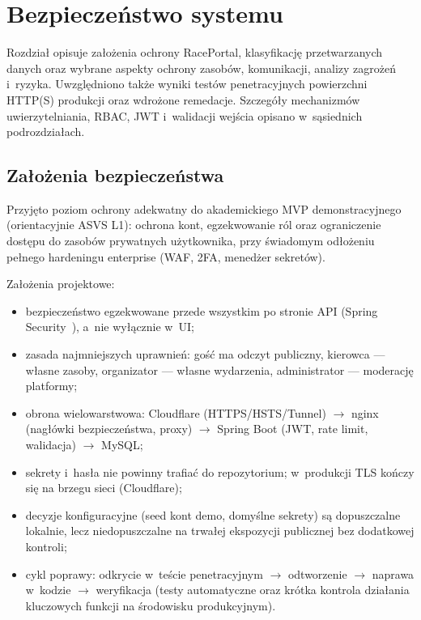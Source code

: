 \documentclass{sprz}
\begin{document}
\chapter{Bezpieczeństwo systemu}
\label{ch:bezpieczenstwo}
Rozdział opisuje założenia ochrony RacePortal, klasyfikację przetwarzanych danych oraz wybrane aspekty ochrony zasobów, komunikacji, analizy zagrożeń i~ryzyka. Uwzględniono także wyniki testów penetracyjnych powierzchni HTTP(S) produkcji oraz wdrożone remedacje. Szczegóły mechanizmów uwierzytelniania, RBAC, JWT i~walidacji wejścia opisano w~sąsiednich podrozdziałach.

\section{Założenia bezpieczeństwa}
Przyjęto poziom ochrony adekwatny do akademickiego MVP demonstracyjnego (orientacyjnie ASVS L1): ochrona kont, egzekwowanie ról oraz ograniczenie dostępu do zasobów prywatnych użytkownika, przy świadomym odłożeniu pełnego hardeningu enterprise (WAF, 2FA, menedżer sekretów).

Założenia projektowe:
\begin{itemize}
  \item bezpieczeństwo egzekwowane przede wszystkim po stronie API (Spring Security~\cite{spring:security}), a~nie wyłącznie w~UI;
  \item zasada najmniejszych uprawnień: gość ma odczyt publiczny, kierowca --- własne zasoby, organizator --- własne wydarzenia, administrator --- moderację platformy;
  \item obrona wielowarstwowa: Cloudflare (HTTPS/HSTS/Tunnel) $\rightarrow$ nginx (nagłówki bezpieczeństwa, proxy) $\rightarrow$ Spring Boot (JWT, rate limit, walidacja) $\rightarrow$ MySQL;
  \item sekrety i~hasła nie powinny trafiać do repozytorium; w~produkcji TLS kończy się na brzegu sieci (Cloudflare);
  \item decyzje konfiguracyjne (seed kont demo, domyślne sekrety) są dopuszczalne lokalnie, lecz niedopuszczalne na trwałej ekspozycji publicznej bez dodatkowej kontroli;
  \item cykl poprawy: odkrycie w~teście penetracyjnym $\rightarrow$ odtworzenie $\rightarrow$ naprawa w~kodzie $\rightarrow$ weryfikacja (testy automatyczne oraz krótka kontrola działania kluczowych funkcji na środowisku produkcyjnym).
\end{itemize}
\end{document}

